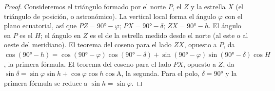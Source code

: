 \begin{proof}
Consideremos el triángulo formado por el  norte $P$, el  $Z$ y
la estrella $X$ (el triángulo de posición, o astronómico). La vertical local forma
el ángulo $\varphi$ con el plano ecuatorial, así que $PZ =
\ang{90} - \varphi$;
$PX = \ang{90} - \delta$; $ZX = \ang{90} - h$. El ángulo en $P$ es el  $H$; el ángulo en $Z$ es el  de la estrella medido desde el norte
(al este o al oeste del meridiano). El teorema del coseno para el lado $ZX$, opuesto
a $P$, da
$\cos(\ang{90} - h) = \cos(\ang{90} - \varphi)\cos(\ang{90} - \delta) +
\sin(\ang{90} - \varphi)\sin(\ang{90} - \delta)\cos H$, la primera fórmula.
El teorema del coseno para el lado $PX$, opuesto a $Z$, da
$\sin\delta = \sin\varphi\sin h + \cos\varphi\cos h\cos\mathrm{A}$, la
segunda. Para el polo, $\delta = \ang{90}$ y la primera fórmula se reduce a
$\sin h = \sin\varphi$.
\end{proof}

